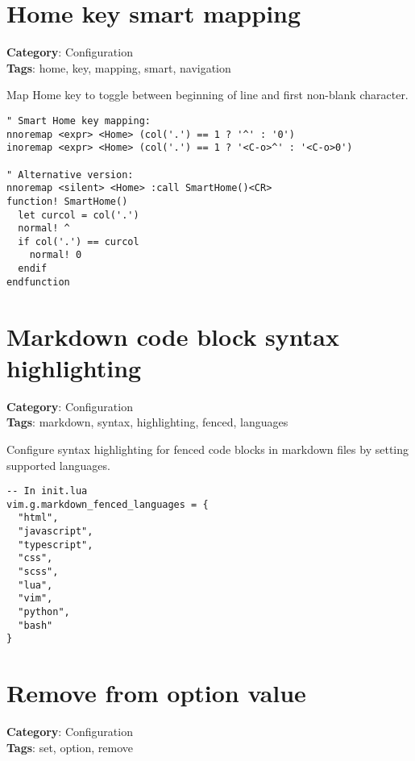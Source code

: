 {{{{\section{Home key smart mapping}

\textbf{Category}: Configuration\\ \textbf{Tags}: home, key, mapping, smart, navigation
\vspace{0.5cm}

Map Home key to toggle between beginning of line and first non-blank character.

\begin{Exa*}{}
\begin{Verbatim}[fontsize=\footnotesize, breaklines, breakanywhere]
" Smart Home key mapping:
nnoremap <expr> <Home> (col('.') == 1 ? '^' : '0')
inoremap <expr> <Home> (col('.') == 1 ? '<C-o>^' : '<C-o>0')

" Alternative version:
nnoremap <silent> <Home> :call SmartHome()<CR>
function! SmartHome()
  let curcol = col('.')
  normal! ^
  if col('.') == curcol
    normal! 0
  endif
endfunction
\end{Verbatim}
\end{Exa*}

\section{Markdown code block syntax highlighting}

\textbf{Category}: Configuration\\ \textbf{Tags}: markdown, syntax, highlighting, fenced, languages
\vspace{0.5cm}

Configure syntax highlighting for fenced code blocks in markdown files by setting supported languages.

\begin{Exa*}{}
\begin{Verbatim}[fontsize=\footnotesize, breaklines, breakanywhere]
-- In init.lua
vim.g.markdown_fenced_languages = { 
  "html", 
  "javascript", 
  "typescript", 
  "css", 
  "scss", 
  "lua", 
  "vim",
  "python",
  "bash"
}
\end{Verbatim}
\end{Exa*}

\section{Remove from option value}

\textbf{Category}: Configuration\\ \textbf{Tags}: set, option, remove
\vspace{0.5cm}

}}}}
